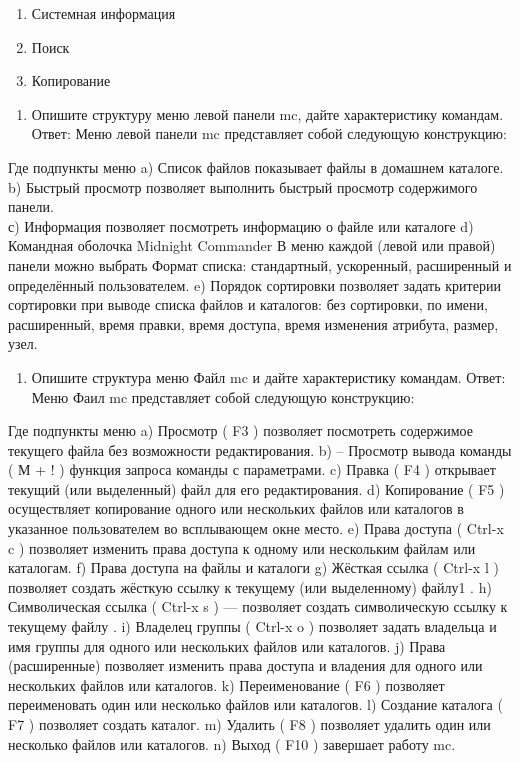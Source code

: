 \documentclass[
  english,
  russian,
  12pt,
  a4paper,
  DIV=11,
  numbers=noendperiod]{scrreprt}
\providecommand{\tightlist}{%
  \setlength{\itemsep}{0pt}\setlength{\parskip}{0pt}}
\begin{document}
\begin{enumerate}
\def\labelenumi{\alph{enumi})}
\tightlist
\item
  Системная информация
\item
  Поиск
\item
  Копирование
\end{enumerate}

\begin{enumerate}
\def\labelenumi{\arabic{enumi}.}
\setcounter{enumi}{2}
\tightlist
\item
  Опишите структуру меню левой панели mc, дайте характеристику командам.
  Ответ: Меню левой панели mc представляет собой следующую конструкцию:
\end{enumerate}

Где подпункты меню a) Список файлов показывает файлы в домашнем
каталоге. b) Быстрый просмотр позволяет выполнить быстрый просмотр
содержимого панели.\\
с) Информация позволяет посмотреть информацию о файле или каталоге d)
Командная оболочка Midnight Commander В меню каждой (левой или правой)
панели можно выбрать Формат списка: стандартный, ускоренный, расширенный
и определённый пользователем. e) Порядок сортировки позволяет задать
критерии сортировки при выводе списка файлов и каталогов: без
сортировки, по имени, расширенный, время правки, время доступа, время
изменения атрибута, размер, узел.

\begin{enumerate}
\def\labelenumi{\arabic{enumi}.}
\setcounter{enumi}{3}
\tightlist
\item
  Опишите структура меню Файл mc и дайте характеристику командам. Ответ:
  Меню Фаил mc представляет собой следующую конструкцию:
\end{enumerate}

Где подпункты меню a) Просмотр ( F3 ) позволяет посмотреть содержимое
текущего файла без возможности редактирования. b) -- Просмотр вывода
команды ( М + ! ) функция запроса команды с параметрами. c) Правка ( F4
) открывает текущий (или выделенный) файл для его редактирования. d)
Копирование ( F5 ) осуществляет копирование одного или нескольких файлов
или каталогов в указанное пользователем во всплывающем окне место. e)
Права доступа ( Ctrl-x c ) позволяет изменить права доступа к одному или
нескольким файлам или каталогам. f) Права доступа на файлы и каталоги g)
Жёсткая ссылка ( Ctrl-x l ) позволяет создать жёсткую ссылку к текущему
(или выделенному) файлу1 . h) Символическая ссылка ( Ctrl-x s ) ---
позволяет создать символическую ссылку к текущему файлу . i) Владелец
группы ( Ctrl-x o ) позволяет задать владельца и имя группы для одного
или нескольких файлов или каталогов. j) Права (расширенные) позволяет
изменить права доступа и владения для одного или нескольких файлов или
каталогов. k) Переименование ( F6 ) позволяет переименовать один или
несколько файлов или каталогов. l) Создание каталога ( F7 ) позволяет
создать каталог. m) Удалить ( F8 ) позволяет удалить один или несколько
файлов или каталогов. n) Выход ( F10 ) завершает работу mc.
\end{document}
